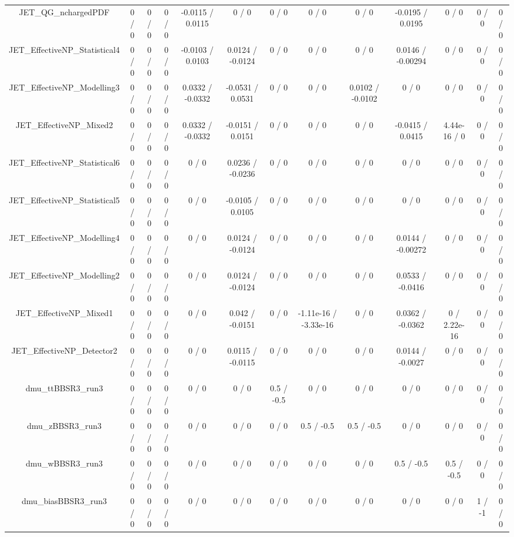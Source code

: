 \documentclass[10pt]{article}
\begin{document}
\begin{table}[htbp]
\begin{center}
\begin{tabular}{|c|c|c|c|c|c|c|c|c|c|c|c|c|}
  JET_QG_nchargedPDF & 0 / 0 & 0 / 0 & 0 / 0 & -0.0115 / 0.0115 & 0 / 0 & 0 / 0 & 0 / 0 & 0 / 0 & -0.0195 / 0.0195 & 0 / 0 & 0 / 0 & 0 / 0 \\ 
  JET_EffectiveNP_Statistical4 & 0 / 0 & 0 / 0 & 0 / 0 & -0.0103 / 0.0103 & 0.0124 / -0.0124 & 0 / 0 & 0 / 0 & 0 / 0 & 0.0146 / -0.00294 & 0 / 0 & 0 / 0 & 0 / 0 \\ 
  JET_EffectiveNP_Modelling3 & 0 / 0 & 0 / 0 & 0 / 0 & 0.0332 / -0.0332 & -0.0531 / 0.0531 & 0 / 0 & 0 / 0 & 0.0102 / -0.0102 & 0 / 0 & 0 / 0 & 0 / 0 & 0 / 0 \\ 
  JET_EffectiveNP_Mixed2 & 0 / 0 & 0 / 0 & 0 / 0 & 0.0332 / -0.0332 & -0.0151 / 0.0151 & 0 / 0 & 0 / 0 & 0 / 0 & -0.0415 / 0.0415 & 4.44e-16 / 0 & 0 / 0 & 0 / 0 \\ 
  JET_EffectiveNP_Statistical6 & 0 / 0 & 0 / 0 & 0 / 0 & 0 / 0 & 0.0236 / -0.0236 & 0 / 0 & 0 / 0 & 0 / 0 & 0 / 0 & 0 / 0 & 0 / 0 & 0 / 0 \\ 
  JET_EffectiveNP_Statistical5 & 0 / 0 & 0 / 0 & 0 / 0 & 0 / 0 & -0.0105 / 0.0105 & 0 / 0 & 0 / 0 & 0 / 0 & 0 / 0 & 0 / 0 & 0 / 0 & 0 / 0 \\ 
  JET_EffectiveNP_Modelling4 & 0 / 0 & 0 / 0 & 0 / 0 & 0 / 0 & 0.0124 / -0.0124 & 0 / 0 & 0 / 0 & 0 / 0 & 0.0144 / -0.00272 & 0 / 0 & 0 / 0 & 0 / 0 \\ 
  JET_EffectiveNP_Modelling2 & 0 / 0 & 0 / 0 & 0 / 0 & 0 / 0 & 0.0124 / -0.0124 & 0 / 0 & 0 / 0 & 0 / 0 & 0.0533 / -0.0416 & 0 / 0 & 0 / 0 & 0 / 0 \\ 
  JET_EffectiveNP_Mixed1 & 0 / 0 & 0 / 0 & 0 / 0 & 0 / 0 & 0.042 / -0.0151 & 0 / 0 & -1.11e-16 / -3.33e-16 & 0 / 0 & 0.0362 / -0.0362 & 0 / 2.22e-16 & 0 / 0 & 0 / 0 \\ 
  JET_EffectiveNP_Detector2 & 0 / 0 & 0 / 0 & 0 / 0 & 0 / 0 & 0.0115 / -0.0115 & 0 / 0 & 0 / 0 & 0 / 0 & 0.0144 / -0.0027 & 0 / 0 & 0 / 0 & 0 / 0 \\ 
  dmu_ttBBSR3_run3 & 0 / 0 & 0 / 0 & 0 / 0 & 0 / 0 & 0 / 0 & 0.5 / -0.5 & 0 / 0 & 0 / 0 & 0 / 0 & 0 / 0 & 0 / 0 & 0 / 0 \\ 
  dmu_zBBSR3_run3 & 0 / 0 & 0 / 0 & 0 / 0 & 0 / 0 & 0 / 0 & 0 / 0 & 0.5 / -0.5 & 0.5 / -0.5 & 0 / 0 & 0 / 0 & 0 / 0 & 0 / 0 \\ 
  dmu_wBBSR3_run3 & 0 / 0 & 0 / 0 & 0 / 0 & 0 / 0 & 0 / 0 & 0 / 0 & 0 / 0 & 0 / 0 & 0.5 / -0.5 & 0.5 / -0.5 & 0 / 0 & 0 / 0 \\ 
  dmu_biasBBSR3_run3 & 0 / 0 & 0 / 0 & 0 / 0 & 0 / 0 & 0 / 0 & 0 / 0 & 0 / 0 & 0 / 0 & 0 / 0 & 0 / 0 & 1 / -1 & 0 / 0 \\ 

\end{tabular}
\end{center}
\end{table}
\end{document}
